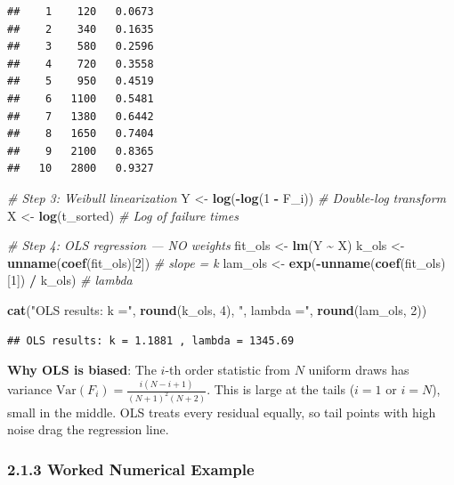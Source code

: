 \documentclass[
]{article}
\newenvironment{Shaded}{\begin{snugshade}}{\end{snugshade}}
\newcommand{\CommentTok}[1]{\textcolor[rgb]{0.56,0.35,0.01}{\textit{#1}}}
\newcommand{\DecValTok}[1]{\textcolor[rgb]{0.00,0.00,0.81}{#1}}
\newcommand{\FunctionTok}[1]{\textcolor[rgb]{0.13,0.29,0.53}{\textbf{#1}}}
\newcommand{\NormalTok}[1]{#1}
\newcommand{\OtherTok}[1]{\textcolor[rgb]{0.56,0.35,0.01}{#1}}
\newcommand{\SpecialCharTok}[1]{\textcolor[rgb]{0.81,0.36,0.00}{\textbf{#1}}}
\newcommand{\StringTok}[1]{\textcolor[rgb]{0.31,0.60,0.02}{#1}}
\begin{document}
\begin{verbatim}
##    1    120   0.0673
##    2    340   0.1635
##    3    580   0.2596
##    4    720   0.3558
##    5    950   0.4519
##    6   1100   0.5481
##    7   1380   0.6442
##    8   1650   0.7404
##    9   2100   0.8365
##   10   2800   0.9327
\end{verbatim}

\begin{Shaded}
\begin{Highlighting}[]
\CommentTok{\# Step 3: Weibull linearization}
\NormalTok{Y }\OtherTok{\textless{}{-}} \FunctionTok{log}\NormalTok{(}\SpecialCharTok{{-}}\FunctionTok{log}\NormalTok{(}\DecValTok{1} \SpecialCharTok{{-}}\NormalTok{ F\_i))   }\CommentTok{\# Double{-}log transform}
\NormalTok{X }\OtherTok{\textless{}{-}} \FunctionTok{log}\NormalTok{(t\_sorted)         }\CommentTok{\# Log of failure times}

\CommentTok{\# Step 4: OLS regression — NO weights}
\NormalTok{fit\_ols }\OtherTok{\textless{}{-}} \FunctionTok{lm}\NormalTok{(Y }\SpecialCharTok{\textasciitilde{}}\NormalTok{ X)}
\NormalTok{k\_ols }\OtherTok{\textless{}{-}} \FunctionTok{unname}\NormalTok{(}\FunctionTok{coef}\NormalTok{(fit\_ols)[}\DecValTok{2}\NormalTok{])           }\CommentTok{\# slope = k}
\NormalTok{lam\_ols }\OtherTok{\textless{}{-}} \FunctionTok{exp}\NormalTok{(}\SpecialCharTok{{-}}\FunctionTok{unname}\NormalTok{(}\FunctionTok{coef}\NormalTok{(fit\_ols)[}\DecValTok{1}\NormalTok{]) }\SpecialCharTok{/}\NormalTok{ k\_ols)  }\CommentTok{\# lambda}

\FunctionTok{cat}\NormalTok{(}\StringTok{"OLS results: k ="}\NormalTok{, }\FunctionTok{round}\NormalTok{(k\_ols, }\DecValTok{4}\NormalTok{), }\StringTok{", lambda ="}\NormalTok{, }\FunctionTok{round}\NormalTok{(lam\_ols, }\DecValTok{2}\NormalTok{))}
\end{Highlighting}
\end{Shaded}

\begin{verbatim}
## OLS results: k = 1.1881 , lambda = 1345.69
\end{verbatim}

\textbf{Why OLS is biased}: The \(i\)-th order statistic from \(N\)
uniform draws has variance
\(\text{Var}(F_i) = \frac{i(N-i+1)}{(N+1)^2(N+2)}\). This is large at
the tails (\(i=1\) or \(i=N\)), small in the middle. OLS treats every
residual equally, so tail points with high noise drag the regression
line.

\subsubsection{2.1.3 Worked Numerical
Example}\label{worked-numerical-example}
\end{document}
